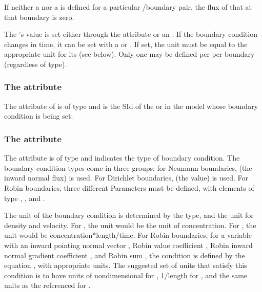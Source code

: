 If neither a \BoundaryCondition nor a \Reaction is defined for a particular \Species/boundary pair, the flux of that \Species at that boundary is zero.


The \Parameter's value is set either through the  attribute or an \InitialAssignment.  If the boundary condition changes in time, it can be set with a \Rule or \Event.  If set, the \Parameter unit must be equal to the appropriate unit for its  (see below).  Only one \BoundaryCondition may be defined per \Species per boundary (regardless of type).


\subsubsection{The \fixttspace{} attribute}
The  attribute of \BoundaryCondition is of type  and is the SId of the \Species or \Parameter in the model whose boundary condition is being set.

\subsubsection{The \fixttspace{} attribute}
The  attribute is of type  and indicates the type of boundary condition. The boundary condition types come in three groups: for Neumann boundaries,  (the inward normal flux) is used.  For Dirichlet boundaries,  (the value) is used.  For Robin boundaries, three different Parameters must be defined, with \BoundaryCondition elements of type , , and .

The unit of the boundary condition is determined by the type, and the unit for density and velocity.  For , the unit would be the unit of concentration.  For , the unit would be concentration*length/time.  For Robin boundaries, for a variable  with an inward pointing normal vector , Robin value coefficient , Robin inward normal gradient coefficient , and Robin sum , the condition is defined by the equation , with appropriate units.  The suggested set of units that satisfy this condition is to have units of nondimensional for , 1/length for , and the same units as the referenced  for .

